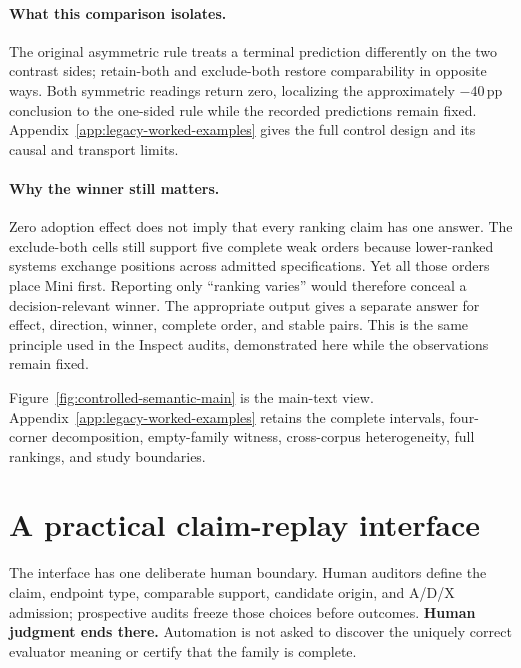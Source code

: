 \documentclass{article}
\newcommand{\pp}{\,pp}
\begin{document}
\paragraph{What this comparison isolates.}
The original asymmetric rule treats a terminal prediction differently on the two contrast sides; retain-both and exclude-both restore comparability in opposite ways.  Both symmetric readings return zero, localizing the approximately \(-40\)\pp{} conclusion to the one-sided rule while the recorded predictions remain fixed.  Appendix~\ref{app:legacy-worked-examples} gives the full control design and its causal and transport limits.

\paragraph{Why the winner still matters.}
Zero adoption effect does not imply that every ranking claim has one answer.  The exclude-both cells still support five complete weak orders because lower-ranked systems exchange positions across admitted specifications.  Yet all those orders place Mini first.  Reporting only ``ranking varies'' would therefore conceal a decision-relevant winner.  The appropriate output gives a separate answer for effect, direction, winner, complete order, and stable pairs.  This is the same principle used in the Inspect audits, demonstrated here while the observations remain fixed.

Figure~\ref{fig:controlled-semantic-main} is the main-text view.  Appendix~\ref{app:legacy-worked-examples} retains the complete intervals, four-corner decomposition, empty-family witness, cross-corpus heterogeneity, full rankings, and study boundaries.

\section{A practical claim-replay interface}

The interface has one deliberate human boundary.  Human auditors define the claim, endpoint type, comparable support, candidate origin, and A/D/X admission; prospective audits freeze those choices before outcomes.  \textbf{Human judgment ends there.}  Automation is not asked to discover the uniquely correct evaluator meaning or certify that the family is complete.
\end{document}
